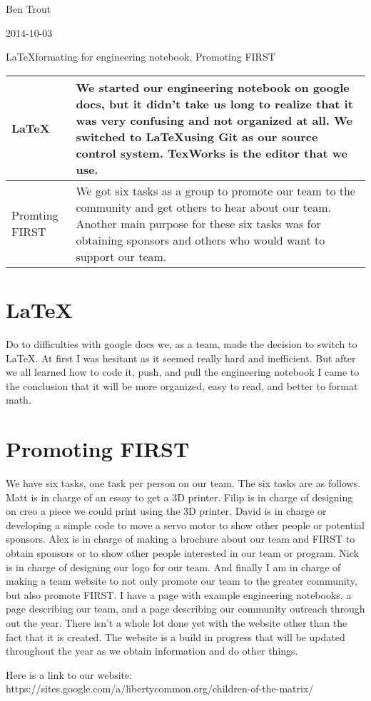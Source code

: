 Ben Trout

2014-10-03

\LaTeX formating for engineering notebook, Promoting FIRST

\begin{tabular}{|p{5cm}|p{5cm}|}
 \hline
 \LaTeX&
 We started our engineering notebook on google docs, but it didn't take us long to realize that it was very confusing and not organized at all. We switched to \LaTeX using Git as our source control system. TexWorks is the editor that we use. 
 \\ 
 \hline
 Promting FIRST&
 We got six tasks as a group to promote our team to the community and get others to hear about our team. Another main purpose for   these six tasks was for obtaining sponsors and others who would want to support our team. 
 \\
 \hline
\end{tabular} 

\section*{\LaTeX}
Do to difficulties with google docs we, as a team, made the decision to switch to \LaTeX. At first I was hesitant as it seemed really hard and inefficient. But after we all learned how to code it, push, and pull the engineering notebook I came to the conclusion that it will be more organized, easy to read, and better to format math. 

\section* {Promoting FIRST}
We have six tasks, one task per person on our team. The six tasks are as follows. Matt is in charge of an essay to get a 3D printer. Filip is in charge of designing on creo a piece we could print using the 3D printer. David is in charge or developing a simple code to move a servo motor to show other people or potential sponsors. Alex is in charge of making a brochure about our team and FIRST to obtain sponsors or to show other people interested in our team or program. Nick is in charge of designing our logo for our team. And finally I am in charge of making a team website to not only promote our team to the greater community, but also promote FIRST. I have a page with example engineering notebooks, a page describing our team, and a page describing our community outreach through out the year. There isn't a whole lot done yet with the website other than the fact that it is created. The website is a build in progress that will be updated throughout the year as we obtain information and do other things. 

Here is a link to our website: https://sites.google.com/a/libertycommon.org/children-of-the-matrix/
  